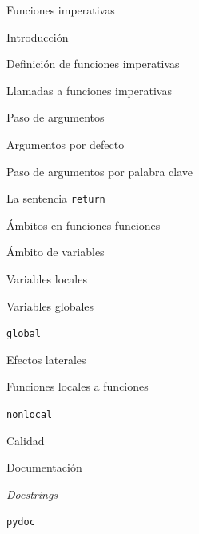 \begin{longenum}
\begin{longenum}
\begin{longenum}
        \end{longenum}
        \item Funciones imperativas
        \begin{longenum}
            \item Introducción
            \item Definición de funciones imperativas
            \item Llamadas a funciones imperativas
            \item Paso de argumentos
            \begin{longenum}
                \item Argumentos por defecto
                \item Paso de argumentos por palabra clave
            \end{longenum}
            \item La sentencia \texttt{return}
        \end{longenum}
        \item Ámbitos en funciones funciones
        \begin{longenum}
            \item Ámbito de variables
            \begin{longenum}
                \item Variables locales
                \item Variables globales
                \begin{longenum}
                    \item \texttt{global}
                    \item Efectos laterales
                \end{longenum}
            \end{longenum}
            \item Funciones locales a funciones
            \begin{longenum}
                \item \texttt{nonlocal}
            \end{longenum}
        \end{longenum}
        \item Calidad \opcional\
        \begin{longenum}
            \item Documentación
            \begin{longenum}
                \item \textit{Docstrings}
                \item \texttt{pydoc}

\end{longenum}
\end{longenum}
\end{longenum}
\end{longenum}
